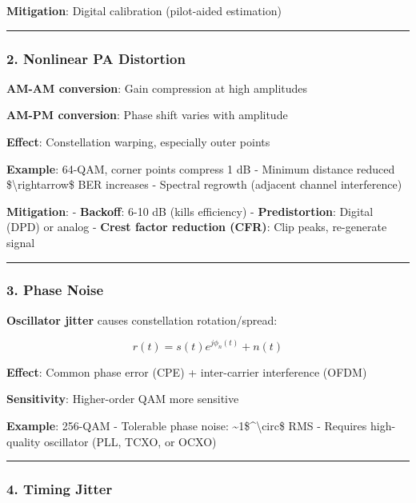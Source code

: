 \textbf{Mitigation}: Digital calibration (pilot-aided estimation)

\begin{center}\rule{0.5\linewidth}{0.5pt}\end{center}

\subsubsection{2. Nonlinear PA
Distortion}\label{nonlinear-pa-distortion}

\textbf{AM-AM conversion}: Gain compression at high amplitudes

\textbf{AM-PM conversion}: Phase shift varies with amplitude

\textbf{Effect}: Constellation warping, especially outer points

\textbf{Example}: 64-QAM, corner points compress 1 dB - Minimum distance
reduced \$\textbackslash rightarrow\$ BER increases - Spectral regrowth
(adjacent channel interference)

\textbf{Mitigation}: - \textbf{Backoff}: 6-10 dB (kills efficiency) -
\textbf{Predistortion}: Digital (DPD) or analog - \textbf{Crest factor
reduction (CFR)}: Clip peaks, re-generate signal

\begin{center}\rule{0.5\linewidth}{0.5pt}\end{center}

\subsubsection{3. Phase Noise}\label{phase-noise}

\textbf{Oscillator jitter} causes constellation rotation/spread:

\[
r(t) = s(t) e^{j\phi_n(t)} + n(t)
\]

\textbf{Effect}: Common phase error (CPE) + inter-carrier interference
(OFDM)

\textbf{Sensitivity}: Higher-order QAM more sensitive

\textbf{Example}: 256-QAM - Tolerable phase noise:
\textasciitilde1\$\^{}\textbackslash circ\$ RMS - Requires high-quality
oscillator (PLL, TCXO, or OCXO)

\begin{center}\rule{0.5\linewidth}{0.5pt}\end{center}

\subsubsection{4. Timing Jitter}\label{timing-jitter}

